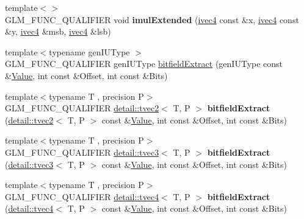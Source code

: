 \begin{DoxyCompactItemize}
\item 
{\footnotesize template$<$$>$ }\\G\+L\+M\+\_\+\+F\+U\+N\+C\+\_\+\+Q\+U\+A\+L\+I\+F\+I\+ER void {\bfseries imul\+Extended} (\hyperlink{group__core__types_gaa4560ddc50320ea8f8a70d5c9c249fea}{ivec4} const \&x, \hyperlink{group__core__types_gaa4560ddc50320ea8f8a70d5c9c249fea}{ivec4} const \&y, \hyperlink{group__core__types_gaa4560ddc50320ea8f8a70d5c9c249fea}{ivec4} \&msb, \hyperlink{group__core__types_gaa4560ddc50320ea8f8a70d5c9c249fea}{ivec4} \&lsb)\hypertarget{namespaceglm_a8aa66966beaab138702abc4f469b9839}{}\label{namespaceglm_a8aa66966beaab138702abc4f469b9839}

\item 
{\footnotesize template$<$typename gen\+I\+U\+Type $>$ }\\G\+L\+M\+\_\+\+F\+U\+N\+C\+\_\+\+Q\+U\+A\+L\+I\+F\+I\+ER gen\+I\+U\+Type \hyperlink{group__core__func__integer_ga251d309beb171bf95117d2c301b2ad8b}{bitfield\+Extract} (gen\+I\+U\+Type const \&\hyperlink{document_8h_a071cf97155ba72ac9a1fc4ad7e63d481}{Value}, int const \&Offset, int const \&Bits)
\item 
{\footnotesize template$<$typename T , precision P$>$ }\\G\+L\+M\+\_\+\+F\+U\+N\+C\+\_\+\+Q\+U\+A\+L\+I\+F\+I\+ER \hyperlink{structglm_1_1detail_1_1tvec2}{detail\+::tvec2}$<$ T, P $>$ {\bfseries bitfield\+Extract} (\hyperlink{structglm_1_1detail_1_1tvec2}{detail\+::tvec2}$<$ T, P $>$ const \&\hyperlink{document_8h_a071cf97155ba72ac9a1fc4ad7e63d481}{Value}, int const \&Offset, int const \&Bits)\hypertarget{namespaceglm_ab80cbec6661f19566dafe4d23f997dee}{}\label{namespaceglm_ab80cbec6661f19566dafe4d23f997dee}

\item 
{\footnotesize template$<$typename T , precision P$>$ }\\G\+L\+M\+\_\+\+F\+U\+N\+C\+\_\+\+Q\+U\+A\+L\+I\+F\+I\+ER \hyperlink{structglm_1_1detail_1_1tvec3}{detail\+::tvec3}$<$ T, P $>$ {\bfseries bitfield\+Extract} (\hyperlink{structglm_1_1detail_1_1tvec3}{detail\+::tvec3}$<$ T, P $>$ const \&\hyperlink{document_8h_a071cf97155ba72ac9a1fc4ad7e63d481}{Value}, int const \&Offset, int const \&Bits)\hypertarget{namespaceglm_adcf06c42671bc9aeba477920df26c02e}{}\label{namespaceglm_adcf06c42671bc9aeba477920df26c02e}

\item 
{\footnotesize template$<$typename T , precision P$>$ }\\G\+L\+M\+\_\+\+F\+U\+N\+C\+\_\+\+Q\+U\+A\+L\+I\+F\+I\+ER \hyperlink{structglm_1_1detail_1_1tvec4}{detail\+::tvec4}$<$ T, P $>$ {\bfseries bitfield\+Extract} (\hyperlink{structglm_1_1detail_1_1tvec4}{detail\+::tvec4}$<$ T, P $>$ const \&\hyperlink{document_8h_a071cf97155ba72ac9a1fc4ad7e63d481}{Value}, int const \&Offset, int const \&Bits)\hypertarget{namespaceglm_a7ac7cf2ac2cacd15c4dc19ef3e69fc07}{}\label{namespaceglm_a7ac7cf2ac2cacd15c4dc19ef3e69fc07}


\end{DoxyCompactItemize}
